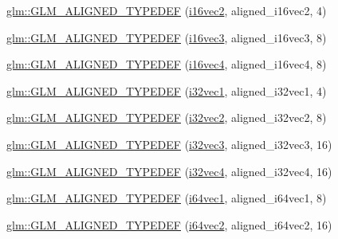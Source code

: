 \begin{DoxyCompactItemize}
\hyperlink{group__gtx__type__aligned_ga9d7cb211ccda69b1c22ddeeb0f3e7aba}{glm\+::\+G\+L\+M\+\_\+\+A\+L\+I\+G\+N\+E\+D\+\_\+\+T\+Y\+P\+E\+D\+EF} (\hyperlink{group__gtc__type__precision_gad912fd04abb876a5b806118ec6e0f283}{i16vec2}, aligned\+\_\+i16vec2, 4)
\item 
\hyperlink{group__gtx__type__aligned_gaaee91dd2ab34423bcc11072ef6bd0f02}{glm\+::\+G\+L\+M\+\_\+\+A\+L\+I\+G\+N\+E\+D\+\_\+\+T\+Y\+P\+E\+D\+EF} (\hyperlink{group__gtc__type__precision_ga1f2b1dd6e4d9109be5f4433c8ff38cb8}{i16vec3}, aligned\+\_\+i16vec3, 8)
\item 
\hyperlink{group__gtx__type__aligned_ga49f047ccaa8b31fad9f26c67bf9b3510}{glm\+::\+G\+L\+M\+\_\+\+A\+L\+I\+G\+N\+E\+D\+\_\+\+T\+Y\+P\+E\+D\+EF} (\hyperlink{group__gtc__type__precision_ga99a249a4cc129cb527c48d3afd38b666}{i16vec4}, aligned\+\_\+i16vec4, 8)
\item 
\hyperlink{group__gtx__type__aligned_ga904e9c2436bb099397c0823506a0771f}{glm\+::\+G\+L\+M\+\_\+\+A\+L\+I\+G\+N\+E\+D\+\_\+\+T\+Y\+P\+E\+D\+EF} (\hyperlink{group__gtc__type__precision_ga97351dd7f0ede9b8b79943f4adcd6a65}{i32vec1}, aligned\+\_\+i32vec1, 4)
\item 
\hyperlink{group__gtx__type__aligned_gaf90651cf2f5e7ee2b11cfdc5a6749534}{glm\+::\+G\+L\+M\+\_\+\+A\+L\+I\+G\+N\+E\+D\+\_\+\+T\+Y\+P\+E\+D\+EF} (\hyperlink{group__gtc__type__precision_ga99191e0de942ecc1df32d522f8064789}{i32vec2}, aligned\+\_\+i32vec2, 8)
\item 
\hyperlink{group__gtx__type__aligned_ga7354a4ead8cb17868aec36b9c30d6010}{glm\+::\+G\+L\+M\+\_\+\+A\+L\+I\+G\+N\+E\+D\+\_\+\+T\+Y\+P\+E\+D\+EF} (\hyperlink{group__gtc__type__precision_ga9811a4ec26e517ea85c785d3f3f4baac}{i32vec3}, aligned\+\_\+i32vec3, 16)
\item 
\hyperlink{group__gtx__type__aligned_gad2ecbdea18732163e2636e27b37981ee}{glm\+::\+G\+L\+M\+\_\+\+A\+L\+I\+G\+N\+E\+D\+\_\+\+T\+Y\+P\+E\+D\+EF} (\hyperlink{group__gtc__type__precision_ga78c16dde5527264e8085b375efba6f28}{i32vec4}, aligned\+\_\+i32vec4, 16)
\item 
\hyperlink{group__gtx__type__aligned_ga965b1c9aa1800e93d4abc2eb2b5afcbf}{glm\+::\+G\+L\+M\+\_\+\+A\+L\+I\+G\+N\+E\+D\+\_\+\+T\+Y\+P\+E\+D\+EF} (\hyperlink{group__gtc__type__precision_gad2bbfb4ed2d4b1e1551c721f81739e49}{i64vec1}, aligned\+\_\+i64vec1, 8)
\item 
\hyperlink{group__gtx__type__aligned_ga1f9e9c2ea2768675dff9bae5cde2d829}{glm\+::\+G\+L\+M\+\_\+\+A\+L\+I\+G\+N\+E\+D\+\_\+\+T\+Y\+P\+E\+D\+EF} (\hyperlink{group__gtc__type__precision_ga8654a1b3a6f81677f53eec13f8dd4224}{i64vec2}, aligned\+\_\+i64vec2, 16)

\end{DoxyCompactItemize}
